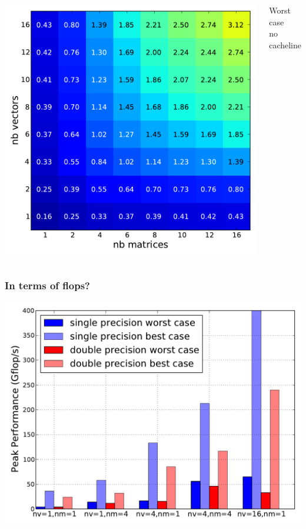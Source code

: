 \documentclass{beamer}
\begin{document}
\begin{frame}
\begin{columns}
    \includegraphics[width=\linewidth]{slides-figures/ICS-figures/flops_to_bytes_no_cache-crop.pdf}
    \begin{center}
      Worst case \\no cacheline
    \end{center}
  \end{columns}
\end{frame}

\begin{frame}
  \frametitle{In terms of flops?}

  \includegraphics[width=.9\linewidth]{slides-figures/ICS-figures/gflops_peak.pdf}

\end{frame}
\end{document}
